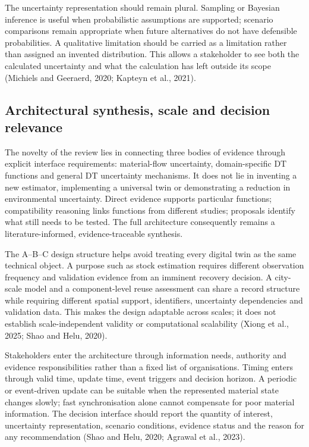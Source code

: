 The uncertainty representation should remain plural. Sampling or Bayesian inference is useful when probabilistic assumptions are supported; scenario comparisons remain appropriate when future alternatives do not have defensible probabilities. A qualitative limitation should be carried as a limitation rather than assigned an invented distribution. This allows a stakeholder to see both the calculated uncertainty and what the calculation has left outside its scope (Michiels and Geeraerd, 2020; Kapteyn et al., 2021).


\subsection{Architectural synthesis, scale and decision relevance}
The novelty of the review lies in connecting three bodies of evidence through explicit interface requirements: material-flow uncertainty, domain-specific DT functions and general DT uncertainty mechanisms. It does not lie in inventing a new estimator, implementing a universal twin or demonstrating a reduction in environmental uncertainty. Direct evidence supports particular functions; compatibility reasoning links functions from different studies; proposals identify what still needs to be tested. The full architecture consequently remains a literature-informed, evidence-traceable synthesis.

The A–B–C design structure helps avoid treating every digital twin as the same technical object. A purpose such as stock estimation requires different observation frequency and validation evidence from an imminent recovery decision. A city-scale model and a component-level reuse assessment can share a record structure while requiring different spatial support, identifiers, uncertainty dependencies and validation data. This makes the design adaptable across scales; it does not establish scale-independent validity or computational scalability (Xiong et al., 2025; Shao and Helu, 2020).

Stakeholders enter the architecture through information needs, authority and evidence responsibilities rather than a fixed list of organisations. Timing enters through valid time, update time, event triggers and decision horizon. A periodic or event-driven update can be suitable when the represented material state changes slowly; fast synchronisation alone cannot compensate for poor material information. The decision interface should report the quantity of interest, uncertainty representation, scenario conditions, evidence status and the reason for any recommendation (Shao and Helu, 2020; Agrawal et al., 2023).


